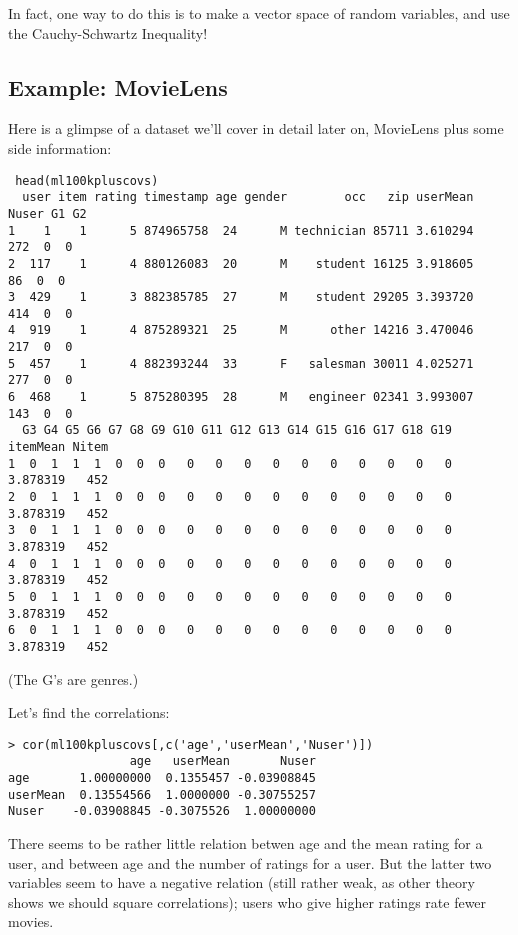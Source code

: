 In fact, one way to do this is to make a vector space of random
variables, and use the Cauchy-Schwartz Inequality!

\subsection{Example:  MovieLens}

Here is a glimpse of a dataset we'll cover in detail later on, MovieLens
plus some side information:

\begin{lstlisting}
 head(ml100kpluscovs)
  user item rating timestamp age gender        occ   zip userMean Nuser G1 G2
1    1    1      5 874965758  24      M technician 85711 3.610294   272  0  0
2  117    1      4 880126083  20      M    student 16125 3.918605    86  0  0
3  429    1      3 882385785  27      M    student 29205 3.393720   414  0  0
4  919    1      4 875289321  25      M      other 14216 3.470046   217  0  0
5  457    1      4 882393244  33      F   salesman 30011 4.025271   277  0  0
6  468    1      5 875280395  28      M   engineer 02341 3.993007   143  0  0
  G3 G4 G5 G6 G7 G8 G9 G10 G11 G12 G13 G14 G15 G16 G17 G18 G19 itemMean Nitem
1  0  1  1  1  0  0  0   0   0   0   0   0   0   0   0   0   0 3.878319   452
2  0  1  1  1  0  0  0   0   0   0   0   0   0   0   0   0   0 3.878319   452
3  0  1  1  1  0  0  0   0   0   0   0   0   0   0   0   0   0 3.878319   452
4  0  1  1  1  0  0  0   0   0   0   0   0   0   0   0   0   0 3.878319   452
5  0  1  1  1  0  0  0   0   0   0   0   0   0   0   0   0   0 3.878319   452
6  0  1  1  1  0  0  0   0   0   0   0   0   0   0   0   0   0 3.878319   452
\end{lstlisting}

(The G's are genres.)

Let's find the correlations:

\begin{lstlisting}
> cor(ml100kpluscovs[,c('age','userMean','Nuser')])
                 age   userMean       Nuser
age       1.00000000  0.1355457 -0.03908845
userMean  0.13554566  1.0000000 -0.30755257
Nuser    -0.03908845 -0.3075526  1.00000000
\end{lstlisting}

There seems to be rather little relation betwen age and the mean rating
for a user, and between age and the number of ratings for a user.  But
the latter two variables seem to have a negative relation (still rather
weak, as other theory shows we should square correlations); users who
give higher ratings rate fewer movies.

